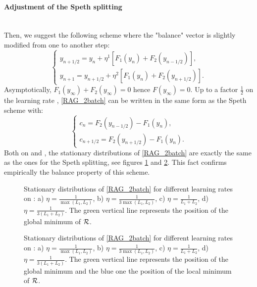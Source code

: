\paragraph{Adjustment of the Speth splitting}
~~\\
Then, we suggest the following scheme where the "balance" vector is slightly modified from one to another step:
\begin{equation}
	\left\{
	\begin{array}{ll}
		y_{n+1/2} = y_n + \eta^1 \left[F_1(y_n)+F_2(y_{n-1/2})\right],\\
		y_{n+1} = y_{n+1/2} + \eta^2 \left[F_1(y_n)+F_2(y_{n+1/2})\right].
	\end{array}
	\right.
	\label{RAG_2batch}
\end{equation}
Asymptotically, $F_1(y_{\infty})+F_2(y_{\infty})=0$ hence $F(y_{\infty})=0$.
Up to a factor $\frac{1}{2}$ on the learning rate , 
\eqref{RAG_2batch} can be written in the same form as the Speth scheme with:
\begin{equation*}
	\left\{
	\begin{array}{ll}
		c_n = F_2(y_{n-1/2})-F_1(y_n),\\
		c_{n+1/2} = F_2(y_{n+1/2})-F_1(y_n).
	\end{array}
	\right.
\end{equation*}
Both on \exOne and \exTwo, the stationary distributions of \eqref{RAG_2batch} are exactly the same as the ones for the Speth splitting, see figures \ref{IAG_ex1} and \ref{IAG_ex2}. This fact confirms empirically the balance property of this scheme.

\begin{figure}[h!]
	\centering
	\scalebox{0.45}{}
	\caption{Stationary distributions of \eqref{RAG_2batch} for different learning rates on \exOne: a) $\eta=\frac{1}{\max(L_1,L_2)}$, b) $\eta=\frac{1}{3\max(L_1,L_2)}$, c) $\eta=\frac{1}{L_1+L_2}$, d) $\eta=\frac{1}{3(L_1+L_2)}$. The green vertical line represents the position of the global minimum of $\mathcal{R}$.}
	\label{IAG_ex1}
\end{figure}

\begin{figure}[h!]
	\centering
	\scalebox{0.45}{}
	\caption{Stationary distributions of \eqref{RAG_2batch} for different learning rates on \exTwo: a) $\eta=\frac{1}{\max(L_1,L_2)}$, b) $\eta=\frac{1}{3\max(L_1,L_2)}$, c) $\eta=\frac{1}{L_1+L_2}$, d) $\eta=\frac{1}{3(L_1+L_2)}$. The green vertical line represents the position of the global minimum and the blue one the position of the local minimum of $\mathcal{R}$.}
	\label{IAG_ex2}
\end{figure}

